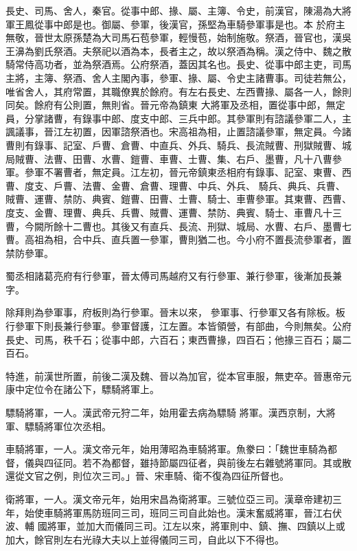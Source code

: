 \begin{pinyinscope}
 長史、司馬、舍人，秦官。從事中郎、掾、屬、主簿、令史，前漢官，陳湯為大將軍王鳳從事中郎是也。御屬、參軍，後漢官，孫堅為車騎參軍事是也。本
 於府主無敬，晉世太原孫楚為大司馬石苞參軍，輕慢苞，始制施敬。祭酒，晉官也，漢吳王濞為劉氏祭酒。夫祭祀以酒為本，長者主之，故以祭酒為稱。漢之侍中、魏之散騎常侍高功者，並為祭酒焉。公府祭酒，蓋因其名也。長史、從事中郎主吏，司馬主將，主簿、祭酒、舍人主閣內事，參軍、掾、屬、令史主諸曹事。司徒若無公，唯省舍人，其府常置，其職僚異於餘府。有左右長史、左西曹掾、屬各一人，餘則同矣。餘府有公則置，無則省。晉元帝為鎮東
 大將軍及丞相，置從事中郎，無定員，分掌諸曹，有錄事中郎、度支中郎、三兵中郎。其參軍則有諮議參軍二人，主諷議事，晉江左初置，因軍諮祭酒也。宋高祖為相，止置諮議參軍，無定員。今諸曹則有錄事、記室、戶曹、倉曹、中直兵、外兵、騎兵、長流賊曹、刑獄賊曹、城局賊曹、法曹、田曹、水曹、鎧曹、車曹、士曹、集、右戶、墨曹，凡十八曹參軍。參軍不署曹者，無定員。江左初，晉元帝鎮東丞相府有錄事、記室、東曹、西曹、度支、戶曹、法曹、金曹、倉曹、理曹、中兵、外兵、
 騎兵、典兵、兵曹、賊曹、運曹、禁防、典賓、鎧曹、田曹、士曹、騎士、車曹參軍。其東曹、西曹、度支、金曹、理曹、典兵、兵曹、賊曹、運曹、禁防、典賓、騎士、車曹凡十三曹，今闕所餘十二曹也。其後又有直兵、長流、刑獄、城局、水曹、右戶、墨曹七曹。高祖為相，合中兵、直兵置一參軍，曹則猶二也。今小府不置長流參軍者，置禁防參軍。



 蜀丞相諸葛亮府有行參軍，晉太傅司馬越府又有行參軍、兼行參軍，後漸加長兼字。



 除拜則為參軍事，府板則為行參軍。晉末以來，
 參軍事、行參軍又各有除板。板行參軍下則長兼行參軍。參軍督護，江左置。本皆領營，有部曲，今則無矣。公府長史、司馬，秩千石；從事中郎，六百石；東西曹掾，四百石；他掾三百石；屬二百石。



 特進，前漢世所置，前後二漢及魏、晉以為加官，從本官車服，無吏卒。晉惠帝元康中定位令在諸公下，驃騎將軍上。



 驃騎將軍，一人。漢武帝元狩二年，始用霍去病為驃騎
 將軍。漢西京制，大將軍、驃騎將軍位次丞相。



 車騎將軍，一人。漢文帝元年，始用薄昭為車騎將軍。魚豢曰：「魏世車騎為都督，儀與四征同。若不為都督，雖持節屬四征者，與前後左右雜號將軍同。其或散還從文官之例，則位次三司。」晉、宋車騎、衛不復為四征所督也。



 衛將軍，一人。漢文帝元年，始用宋昌為衛將軍。三號位亞三司。漢章帝建初三年，始使車騎將軍馬防班同三司，班同三司自此始也。漢末奮威將軍，晉江右伏波、輔
 國將軍，並加大而儀同三司。江左以來，將軍則中、鎮、撫、四鎮以上或加大，餘官則左右光祿大夫以上並得儀同三司，自此以下不得也。




\end{pinyinscope}
